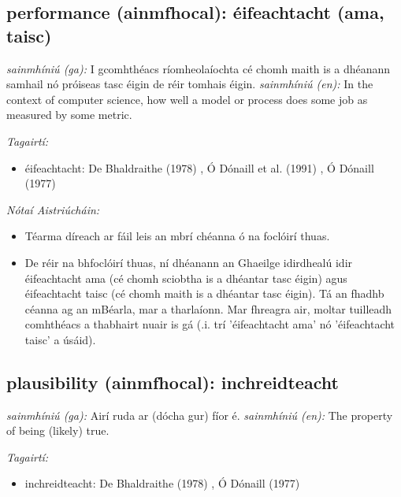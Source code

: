 \documentclass{article}
\begin{document}
\subsection*{performance (ainmfhocal): éifeachtacht (ama, taisc)} 
 \noindent \textit{sainmhíniú (ga):} I gcomhthéacs ríomheolaíochta cé chomh maith is a dhéanann samhail nó próiseas tasc éigin de réir tomhais éigin.
\newline\newline
 \noindent \textit{sainmhíniú (en):} In the context of computer science, how well a model or process does some job as measured by some metric.
\newline

 \noindent \textit{Tagairtí:}
\begin{itemize}
	\item éifeachtacht: De Bhaldraithe (1978) \cite{de-bhaldraithe}, Ó Dónaill et al. (1991) \cite{focloir-beag}, Ó Dónaill (1977) \cite{odonaill}
\end{itemize}

 \noindent \textit{Nótaí Aistriúcháin:}
\begin{itemize}
	\item Téarma díreach ar fáil leis an mbrí chéanna ó na foclóirí thuas.
	\item De réir na bhfoclóirí thuas, ní dhéanann an Ghaeilge idirdhealú idir éifeachtacht ama (cé chomh sciobtha is a dhéantar tasc éigin) agus éifeachtacht taisc (cé chomh maith is a dhéantar tasc éigin). Tá an fhadhb céanna ag an mBéarla, mar a tharlaíonn. Mar fhreagra air, moltar tuilleadh comhthéacs a thabhairt nuair is gá (.i. trí 'éifeachtacht ama' nó 'éifeachtacht taisc' a úsáid).
\end{itemize}


\subsection*{plausibility (ainmfhocal): inchreidteacht} 
 \noindent \textit{sainmhíniú (ga):} Airí ruda ar (dócha gur) fíor é.
\newline\newline
 \noindent \textit{sainmhíniú (en):} The property of being (likely) true.
\newline

 \noindent \textit{Tagairtí:}
\begin{itemize}
	\item inchreidteacht: De Bhaldraithe (1978) \cite{de-bhaldraithe}, Ó Dónaill (1977) \cite{odonaill}
\end{itemize}
\end{document}

